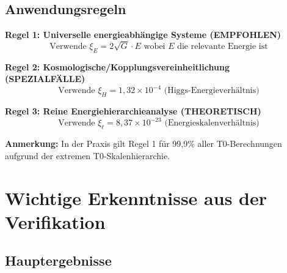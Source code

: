 	\subsection{Anwendungsregeln}
	
	\begin{tcolorbox}[colback=blue!5!white,colframe=blue!75!black,title=Anwendungsregeln für $\xi$-Parameter (Reine Energie)]
		\textbf{Regel 1: Universelle energieabhängige Systeme (EMPFOHLEN)}
		\begin{equation}
			\text{Verwende } \xi_E = 2\sqrt{G} \cdot E \text{ wobei } E \text{ die relevante Energie ist}
		\end{equation}
		
		\textbf{Regel 2: Kosmologische/Kopplungsvereinheitlichung (SPEZIALFÄLLE)}
		\begin{equation}
			\text{Verwende } \xi_H = 1,32 \times 10^{-4} \text{ (Higgs-Energieverhältnis)}
		\end{equation}
		
		\textbf{Regel 3: Reine Energiehierarchieanalyse (THEORETISCH)}
		\begin{equation}
			\text{Verwende } \xi_\ell = 8,37 \times 10^{-23} \text{ (Energieskalenverhältnis)}
		\end{equation}
		
		\textbf{Anmerkung:} In der Praxis gilt Regel 1 für 99,9\% aller T0-Berechnungen aufgrund der extremen T0-Skalenhierarchie.
	\end{tcolorbox}
	
	\section{Wichtige Erkenntnisse aus der Verifikation}
	
	\subsection{Hauptergebnisse}
	
